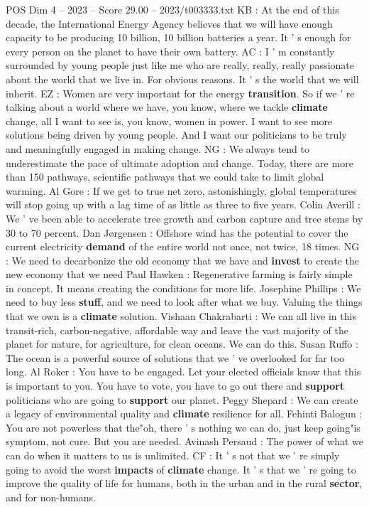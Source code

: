 \begin{textsample}{POS Dim 4 – 2023 – Score 29.00 – 2023/t003333.txt}
KB : At the end of this decade, the International Energy Agency believes that we will have enough capacity to be producing 10 billion, 10 billion batteries a year.
It ' s enough for every person on the planet to have their own battery.
AC : I ' m constantly surrounded by young people just like me who are really, really, really passionate about the world that we live in.
For obvious reasons.
It ' s the world that we will inherit.
EZ : Women are very important for the energy \textbf{transition}.
So if we ' re talking about a world where we have, you know, where we tackle \textbf{climate} change, all I want to see is, you know, women in power.
I want to see more solutions being driven by young people.
And I want our politicians to be truly and meaningfully engaged in making change.
NG : We always tend to underestimate the pace of ultimate adoption and change.
Today, there are more than 150 pathways, scientific pathways that we could take to limit global warming.
Al Gore : If we get to true net zero, astonishingly, global temperatures will stop going up with a lag time of as little as three to five years.
Colin Averill : We ' ve been able to accelerate tree growth and carbon capture and tree stems by 30 to 70 percent.
Dan Jørgensen : Offshore wind has the potential to cover the current electricity \textbf{demand} of the entire world not once, not twice, 18 times.
NG : We need to decarbonize the old economy that we have and \textbf{invest} to create the new economy that we need Paul Hawken : Regenerative farming is fairly simple in concept.
It means creating the conditions for more life.
Josephine Phillips : We need to buy less \textbf{stuff}, and we need to look after what we buy.
Valuing the things that we own is a \textbf{climate} solution.
Vishaan Chakrabarti : We can all live in this transit-rich, carbon-negative, affordable way and leave the vast majority of the planet for nature, for agriculture, for clean oceans.
We can do this.
Susan Ruffo : The ocean is a powerful source of solutions that we ' ve overlooked for far too long.
Al Roker : You have to be engaged.
Let your elected officials know that this is important to you.
You have to vote, you have to go out there and \textbf{support} politicians who are going to \textbf{support} our planet.
Peggy Shepard : We can create a legacy of environmental quality and \textbf{climate} resilience for all.
Fehinti Balogun : You are not powerless that the"oh, there ' s nothing we can do, just keep going"is symptom, not cure.
But you are needed.
Avinash Persaud : The power of what we can do when it matters to us is unlimited.
CF : It ' s not that we ' re simply going to avoid the worst \textbf{impacts} of \textbf{climate} change.
It ' s that we ' re going to improve the quality of life for humans, both in the urban and in the rural \textbf{sector}, and for non-humans.

\end{textsample}
